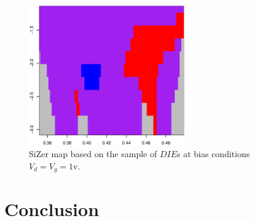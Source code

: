 \documentclass[sn-mathphys]{sn-jnl}%
\theoremstyle{thmstyleone}%
\theoremstyle{thmstyletwo}%
\theoremstyle{thmstylethree}%
\begin{document}
\begin{figure}[ht]
	\centerline{\includegraphics [width=0.6\textwidth]{Fig15_sizerd1g1.eps}}
	\caption{SiZer map based on the sample of $DIE$s at bias conditions $V_d=V_g=1$v.}
	\label{fig:sizer4}
\end{figure}


\section{Conclusion}\label{sec:concl}
\end{document}
